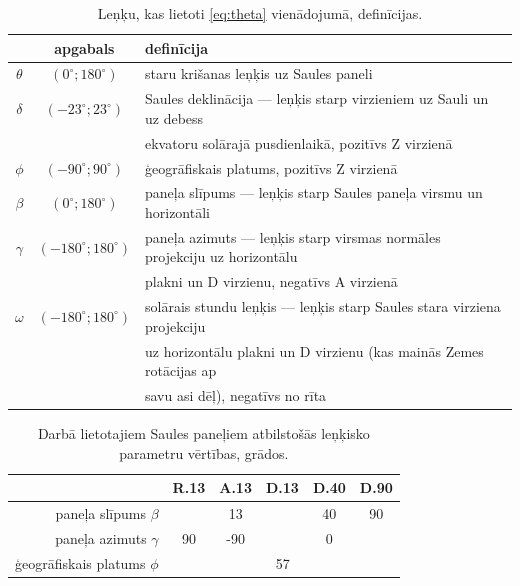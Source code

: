\begin{table}[h!]
	\caption{Leņķu, kas lietoti \ref{eq:theta} vienādojumā, definīcijas.}
	\begin{center}
		\begin{tabular}{|c|c|l|}
			\hline
			         &         apgabals         & definīcija                                                                 \\ \hline
			$\theta$ &  $(0^\circ;180^\circ)$   & staru krišanas leņķis uz Saules paneli                                     \\ \hline
			$\delta$ &  $(-23^\circ;23^\circ)$  & Saules deklinācija --- leņķis starp virzieniem uz Sauli un uz debess       \\
			         &                          & ekvatoru solārajā pusdienlaikā, pozitīvs Z virzienā                        \\ \hline
			 $\phi$  &  $(-90^\circ;90^\circ)$  & ģeogrāfiskais platums, pozitīvs Z virzienā                                 \\ \hline
			$\beta$  &  $(0^\circ;180^\circ)$   & paneļa slīpums --- leņķis starp Saules paneļa virsmu un horizontāli        \\ \hline
			$\gamma$ & $(-180^\circ;180^\circ)$ & paneļa azimuts --- leņķis starp virsmas normāles projekciju uz horizontālu \\
			         &                          & plakni un D virzienu, negatīvs A virzienā                                  \\ \hline
			$\omega$ & $(-180^\circ;180^\circ)$ & solārais stundu leņķis --- leņķis starp Saules stara virziena projekciju   \\
			         &                          & uz horizontālu plakni un D virzienu (kas mainās Zemes rotācijas ap         \\
			         &                          & savu asi dēļ), negatīvs no rīta                                            \\ \hline
		\end{tabular}
	\end{center}
	\label{tab:theta}
\end{table}

\begin{table}[h!]
	\caption{Darbā lietotajiem Saules paneļiem atbilstošās leņķisko parametru vērtības, grādos.}
	\begin{center}
		\begin{tabular}{|r|c|c|c|c|c|}
			\hline
			         & R.13 & A.13 &   D.13   & D.40 & D.90 \\ \hline\hline
			paneļa slīpums $\beta$  & \multicolumn{3}{c|}{13} &  40  &  90  \\ \hline
			paneļa azimuts $\gamma$ &  90  & -90  & \multicolumn{3}{c|}{0}  \\ \hline
			ģeogrāfiskais platums $\phi$  &        \multicolumn{5}{c|}{57}        \\ \hline
		\end{tabular}
	\end{center}
	\label{tab:param}
\end{table}

